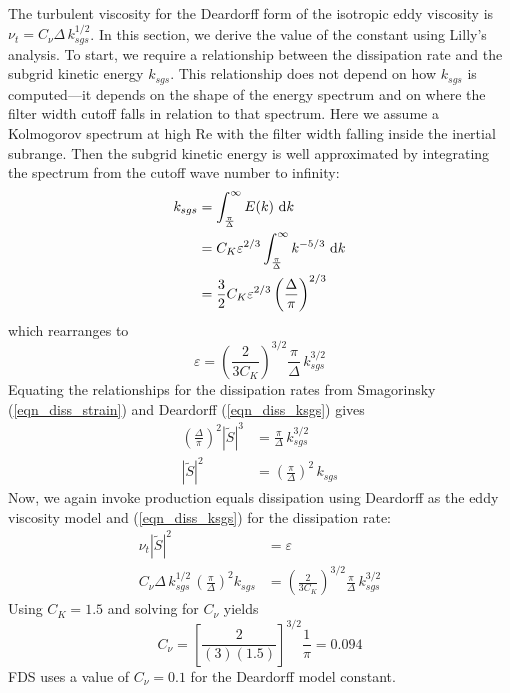 The turbulent viscosity for the Deardorff form of the isotropic eddy viscosity is $\nu_t = C_\nu \Delta \, k_{sgs}^{1/2}$.  In this section, we derive the value of the constant using Lilly's analysis.  To start, we require a relationship between the dissipation rate and the subgrid kinetic energy $k_{sgs}$.  This relationship does not depend on how $k_{sgs}$ is computed---it depends on the shape of the energy spectrum and on where the filter width cutoff falls in relation to that spectrum.  Here we assume a Kolmogorov spectrum at high Re with the filter width falling inside the inertial subrange.  Then the subgrid kinetic energy is well approximated by integrating the spectrum from the cutoff wave number to infinity:
\begin{align}
k_{sgs} &= \int_{\frac{\pi}{\Delta}}^\infty E(k) \,\,\mathrm{d} k \\
&= C_K \varepsilon^{2/3} \int_{\frac{\pi}{\Delta}}^\infty k^{-5/3} \,\,\mathrm{d} k \\
&= \frac{3}{2} C_K \varepsilon^{2/3} \left(\frac{\Delta}{\pi}\right)^{2/3}
\end{align}
which rearranges to
\begin{equation}
\label{eqn_diss_ksgs}
\varepsilon = \left(\frac{2}{3 C_K}\right)^{3/2} \frac{\pi}{\Delta} \,k_{sgs}^{3/2}
\end{equation}
Equating the relationships for the dissipation rates from Smagorinsky (\ref{eqn_diss_strain}) and Deardorff (\ref{eqn_diss_ksgs}) gives
\begin{align}
\left(\frac{\Delta}{\pi}\right)^2 |\tilde{S}|^3 &= \frac{\pi}{\Delta} \,k_{sgs}^{3/2} \\
|\tilde{S}|^2 &= \left( \frac{\pi}{\Delta} \right)^2 \,k_{sgs}
\end{align}
Now, we again invoke production equals dissipation using Deardorff as the eddy viscosity model and (\ref{eqn_diss_ksgs}) for the dissipation rate:
\begin{align}
\nu_t |\tilde{S}|^2 &= \varepsilon \\
C_\nu \Delta \,k_{sgs}^{1/2} \, \left(\frac{\pi}{\Delta}\right)^2 k_{sgs} &= \left(\frac{2}{3 C_K}\right)^{3/2} \frac{\pi}{\Delta} \,k_{sgs}^{3/2}
\end{align}
Using $C_K = 1.5$ and solving for $C_\nu$ yields
\begin{equation}
C_\nu = \left[\frac{2}{(3)(1.5)}\right]^{3/2} \frac{1}{\pi} = 0.094
\end{equation}
FDS uses a value of $C_\nu = 0.1$ for the Deardorff model constant.


